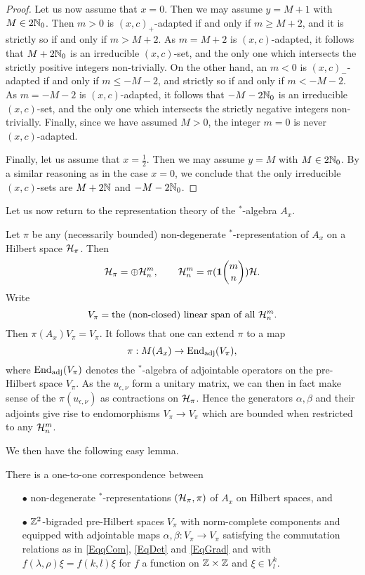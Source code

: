 \begin{proof}
Let us now assume that $x=0$. Then we may assume $y=M+1$ with $M\in 2\mathbb{N}_0$. Then $m>0$ is $(x,c)_+$-adapted if and only if $m\geq M+2$, and it is strictly so if and only if $m>M+2$. As $m=M+2$ is $(x,c)$-adapted, it follows that $M+2\mathbb{N}_0$ is an irreducible $(x,c)$-set, and the only one which intersects the strictly positive integers non-trivially. On the other hand, an $m<0$ is $(x,c)_-$-adapted if and only if $m\leq -M-2$, and strictly so if and only if $m<-M-2$. As $m=-M-2$ is $(x,c)$-adapted, it follows that $-M-2\mathbb{N}_0$ is an irreducible $(x,c)$-set, and the only one which intersects the strictly negative integers non-trivially. Finally, since we have assumed $M>0$, the integer $m=0$ is never $(x,c)$-adapted.

Finally, let us assume that $x=\frac{1}{2}$. Then we may assume $y=M$ with $M\in 2\mathbb{N}_0$. By a similar reasoning as in the case $x=0$, we conclude that the only irreducible $(x,c)$-sets are $M+2\mathbb{N}$ and $-M-2\mathbb{N}_0$.
\end{proof} 

Let us now return to the representation theory of the $^*$-algebra $A_x$.

Let $\pi$ be any (necessarily bounded) non-degenerate $^*$-representation of $A_x$ on a Hilbert space $\mathcal{H}_{\pi}$. Then \[\mathcal{H}_{\pi} = \oplus \mathcal{H}^{m}_{n},\qquad \mathcal{H}^{m}_{n} = \pi(\mathbf{1}\!\begin{pmatrix} m \\ n\end{pmatrix})\mathcal{H}.\] Write \[V_{\pi} =  \textrm{the (non-closed) linear span of all }\mathcal{H}^{m}_{n}.\] Then $\pi(A_x)V_{\pi} = V_{\pi}$. It follows that one can extend $\pi$ to a map \[\pi: M(A_x) \rightarrow \operatorname{\mathrm{End}}_{\operatorname{\mathrm{adj}}}(V_{\pi}),\] where $\operatorname{\mathrm{End}}_{\operatorname{\mathrm{adj}}}(V_{\pi})$ denotes the $^*$-algebra of adjointable operators on the pre-Hilbert space $V_{\pi}$. As the $u_{\epsilon,\nu}$ form a unitary matrix, we can then in fact make sense of the $\pi(u_{\epsilon,\nu})$ as contractions on $\mathcal{H}_{\pi}$. Hence the generators $\alpha,\beta$ and their adjoints give rise to endomorphisms $V_{\pi}\rightarrow V_{\pi}$ which are bounded when restricted to any $\mathcal{H}^{m}_{n}$.

We then have the following easy lemma.

\begin{Lem} There is a one-to-one correspondence between\begin{itemize}\item[$\bullet$] non-degenerate $^*$-representations $(\mathcal{H}_{\pi},\pi)$ of $A_x$ on Hilbert spaces, and 
\item[$\bullet$] $\mathbb{Z}^2$-bigraded pre-Hilbert spaces $V_{\pi}$ with norm-complete components and equipped with adjointable maps $\alpha,\beta:V_{\pi}\rightarrow V_{\pi}$ satisfying the commutation relations as in \eqref{EqqCom}, \eqref{EqDet} and \eqref{EqGrad} and with $f(\lambda,\rho)\xi = f(k,l)\xi$ for $f$ a function on $\mathbb{Z}\times \mathbb{Z}$ and $\xi\in V^k_l$.
\end{itemize}
\end{Lem}


